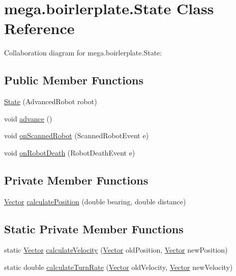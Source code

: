 \hypertarget{classmega_1_1boirlerplate_1_1_state}{}\section{mega.\+boirlerplate.\+State Class Reference}
\label{classmega_1_1boirlerplate_1_1_state}


Collaboration diagram for mega.\+boirlerplate.\+State\+:
\subsection*{Public Member Functions}
\begin{DoxyCompactItemize}
\item 
\hyperlink{classmega_1_1boirlerplate_1_1_state_a19a49e8e63e25e857701db1fb232c4e6}{State} (Advanced\+Robot robot)
\item 
void \hyperlink{classmega_1_1boirlerplate_1_1_state_a7fe93033ef2498bcd8d8d5c0d777d816}{advance} ()
\item 
void \hyperlink{classmega_1_1boirlerplate_1_1_state_a1a75c57383d9e9d41c609e2fa4acea0f}{on\+Scanned\+Robot} (Scanned\+Robot\+Event e)
\item 
void \hyperlink{classmega_1_1boirlerplate_1_1_state_a6c3bf3b3b16fc0f1b15cc2ba1d63c575}{on\+Robot\+Death} (Robot\+Death\+Event e)
\end{DoxyCompactItemize}
\subsection*{Private Member Functions}
\begin{DoxyCompactItemize}
\item 
\hyperlink{classmega_1_1boirlerplate_1_1_vector}{Vector} \hyperlink{classmega_1_1boirlerplate_1_1_state_a5701db7eabb0dd0edf293082879f4880}{calculate\+Position} (double bearing, double distance)
\end{DoxyCompactItemize}
\subsection*{Static Private Member Functions}
\begin{DoxyCompactItemize}
\item 
static \hyperlink{classmega_1_1boirlerplate_1_1_vector}{Vector} \hyperlink{classmega_1_1boirlerplate_1_1_state_aca2f99643fa4c2d6f45a2230f56ecba2}{calculate\+Velocity} (\hyperlink{classmega_1_1boirlerplate_1_1_vector}{Vector} old\+Position, \hyperlink{classmega_1_1boirlerplate_1_1_vector}{Vector} new\+Position)
\item 
static double \hyperlink{classmega_1_1boirlerplate_1_1_state_aa70df138d69de469048d7071125fb261}{calculate\+Turn\+Rate} (\hyperlink{classmega_1_1boirlerplate_1_1_vector}{Vector} old\+Velocity, \hyperlink{classmega_1_1boirlerplate_1_1_vector}{Vector} new\+Velocity)
\end{DoxyCompactItemize}


